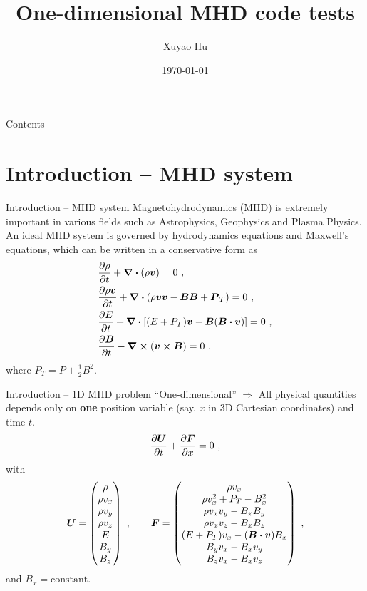 \documentclass[12pt]{beamer}
\title[1d MHD code]{One-dimensional MHD code tests}
\author[Xuyao Hu]{Xuyao Hu}
\institute[NYU]{Department of Physics, New York University}
\date{\today}
\begin{document}
\maketitle

\begin{frame}{Contents}	
	\tableofcontents
\end{frame}

\section{Introduction -- MHD system}
\begin{frame}{Introduction -- MHD system}
Magnetohydrodynamics (MHD) is extremely important in various fields such as 
Astrophysics, Geophysics and Plasma Physics.\\ 
An ideal MHD system is governed by hydrodynamics equations and Maxwell's equations,
which can be written in a conservative form as
 \begin{align}
 	&\pdv{\rho}{t}+\div (\rho \vb*{v})=0 \ , \\
	&\pdv{\rho \vb*{v}}{t} +\div (\rho \vb*{v}\vb*{v}-\vb*{B}\vb*{B}+\vb*{P}_T)=0 \ , \\
	&\pdv{E}{t} + \div [(E+P_T)\vb*{v}-\vb*{B}(\vb*{B}\vdot\vb*{v})]=0 \ , \\
	&\pdv{\vb*{B}}{t}-\curl (\vb*{v} \cross \vb*{B})=0 \ ,
 \end{align}
 where $P_T=P+\frac{1}{2}B^2$.

\end{frame}

\begin{frame}{Introduction -- 1D MHD problem}
``One-dimensional'' $\Longrightarrow$ All physical quantities depends only on \textbf{one} 
position variable (say, $x$ in 3D Cartesian coordinates) and time $t$.
\begin{align}
	\pdv{\vb*{U}}{t}+\pdv{\vb*{F}}{x}=0 \ ,
\end{align}
with
\begin{align}
	\vb*{U}=\begin{pmatrix}
	\rho \\
	\rho v_x \\
	\rho v_y \\
	\rho v_z \\
	E \\
	B_y \\
	B_z
	\end{pmatrix} \ , 
	\qquad 
	\vb*{F}=\begin{pmatrix}
	\rho v_x \\
	\rho v_x^2 + P_T -B_x^2 \\
	\rho v_x v_y - B_x B_y \\
	\rho v_x v_z - B_x B_z \\
	(E+P_T)v_x - (\vb*{B}\vdot\vb*{v}) B_x \\
	B_y v_x - B_x v_y \\
	B_z v_x - B_x v_z
	\end{pmatrix} \ ,
\end{align}
and $B_x = \text{constant}$.
\end{frame}
\end{document}
